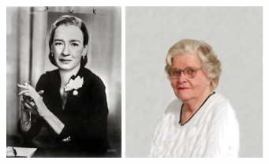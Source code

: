 \documentclass[xcolor={usenames,dvipsnames,svgnames,table},12pt]{beamer}
\begin{document}
\begin{frame}{}
  \begin{center}
    \includegraphics[height=2in]{grace-hopper.jpg} \quad
    \includegraphics[height=2in]{jean-bartik-cropped.png}
  \end{center}
\end{frame}
\end{document}

